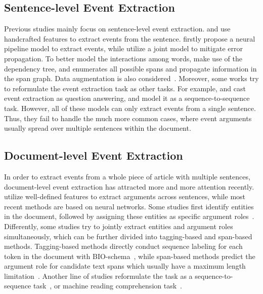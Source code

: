 

\subsection{Sentence-level Event Extraction}
Previous studies mainly focus on sentence-level event extraction.
\citet{li-etal-2014-constructing} and \citet{judea-strube-2016-incremental} use handcrafted features to extract events from the sentence. \citet{chen-etal-2015-event} firstly propose a neural pipeline model to extract events, while \citet{nguyen-etal-2016-joint} utilize a joint model to mitigate error propagation.
To better model the interactions among  words, \citet{liu-etal-2018-jointly, yan-etal-2019-event, ma-etal-2020-resource} make use of the dependency tree, and \citet{wadden-etal-2019-entity} enumerates all possible spans and propagate information in the span graph.
Data augmentation is also considered~\citep{yang-etal-2019-exploring-pre}.
Moreover, some works try to reformulate the event extraction task as other tasks.
For example, \citet{du-cardie-2020-event} and \citet{DBLP:conf/aaai/Zhou0ZWXL21} cast event extraction as question answering, and \citet{DBLP:journals/corr/abs-2107-00189} model it as a sequence-to-sequence task.
However, all of these models can only extract events from a single sentence.
Thus, they fail to handle the much more common cases, where event arguments usually spread over multiple sentences within the document.

\subsection{Document-level Event Extraction}

In order to extract events from a whole piece of article with multiple sentences, document-level event extraction has attracted more and more attention recently.
\citet{yang-mitchell-2016-joint} utilize well-defined features to extract arguments across sentences, while most recent methods are based on neural networks.
Some studies first identify entities in the document, followed by assigning these entities as specific argument roles~\citep{yang-etal-2018-dcfee, zheng-etal-2019-doc2edag, xu-etal-2021-git}.
Differently, some studies try to jointly extract entities and argument roles simultaneously, which can be further divided into tagging-based and span-based methods.
Tagging-based methods directly conduct sequence labeling for each token in the document with BIO-schema~\citep{du-cardie-2020-document, DBLP:conf/pakdd/VeysehDTMWJKCN21}, while span-based methods predict the argument role for candidate text spans which usually have a maximum length limitation~\citep{rams, two-step}.
Another line of studies reformulate the task as a sequence-to-sequence task~\citep{du-etal-2021-grit,du-etal-2021-template,wikievent}, or machine reading comprehension task~\citep{wei-etal-2021-trigger}.

